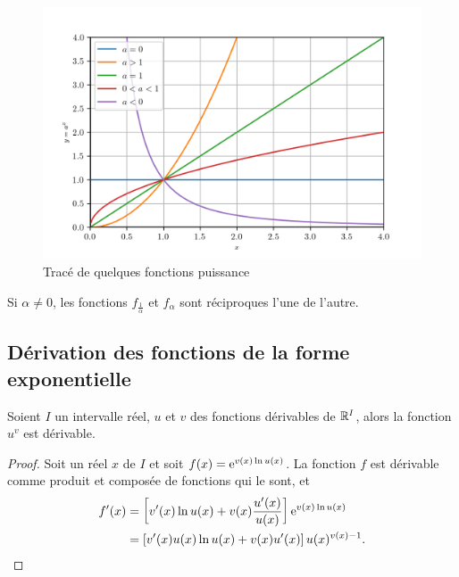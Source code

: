       \begin{figure}
        \centering
        \includegraphics[scale = 1.0]{puiss.png}
        \caption{Tracé de quelques fonctions puissance}
        \label{figtracepuissance}
      \end{figure}

      Si \(\alpha \neq 0\), les fonctions \(f_{\frac{1}{\alpha}}\) et 
      \(f_\alpha\) sont réciproques l'une de l'autre.

      \subsection{Dérivation des fonctions de la forme exponentielle}
      \label{subsec:chap1-derivationdesfonctionsdelaformeexponentielle}

      \begin{prop}
        Soient \(I\) un intervalle réel, \(u\) et \(v\) des fonctions dérivables 
        de \(\mathbb{R}^{I}\), alors la fonction \(u^v\) est dérivable.
      \end{prop}
      \begin{proof}
        Soit un réel \(x\) de \(I\) et soit \(f(x) = \operatorname{e}^{v(x) \ln u(x)}\).  La 
        fonction \(f\) est dérivable comme produit et composée de fonctions qui 
        le sont, et
        \begin{align*}
          f'(x) & = \left[ v'(x) \ln u(x) + v(x) \frac{u'(x)}{u(x)} 
          \right]\operatorname{e}^{v(x) \ln u(x)} \\
                &= \left[v'(x)u(x)\ln u(x) + v(x) u'(x) \right]u(x)^{v(x)-1}.
          \end{align*}
        \end{proof}


